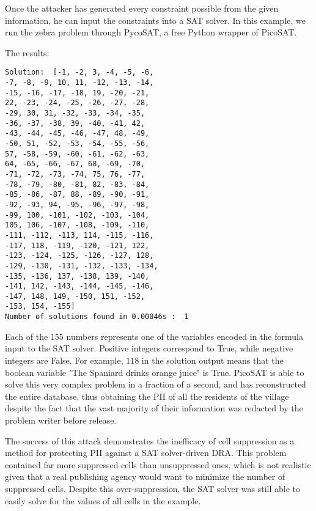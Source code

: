 \documentclass[jou,apacite]{apa6}
\begin{document}
Once the attacker has generated every constraint possible from the given information, he can input the constraints into a SAT solver. In this example, we run the zebra problem through PycoSAT, a free Python wrapper of PicoSAT.

The results:

\begin{verbatim}
Solution:  [-1, -2, 3, -4, -5, -6,
-7, -8, -9, 10, 11, -12, -13, -14,
-15, -16, -17, -18, 19, -20, -21,
22, -23, -24, -25, -26, -27, -28,
-29, 30, 31, -32, -33, -34, -35,
-36, -37, -38, 39, -40, -41, 42,
-43, -44, -45, -46, -47, 48, -49,
-50, 51, -52, -53, -54, -55, -56,
57, -58, -59, -60, -61, -62, -63,
64, -65, -66, -67, 68, -69, -70,
-71, -72, -73, -74, 75, 76, -77,
-78, -79, -80, -81, 82, -83, -84,
-85, -86, -87, 88, -89, -90, -91,
-92, -93, 94, -95, -96, -97, -98,
-99, 100, -101, -102, -103, -104,
105, 106, -107, -108, -109, -110,
-111, -112, -113, 114, -115, -116,
-117, 118, -119, -120, -121, 122,
-123, -124, -125, -126, -127, 128,
-129, -130, -131, -132, -133, -134,
-135, -136, 137, -138, 139, -140,
-141, 142, -143, -144, -145, -146,
-147, 148, 149, -150, 151, -152,
-153, 154, -155]
Number of solutions found in 0.00046s :  1
\end{verbatim}

Each of the 155 numbers represents one of the variables encoded in the formula input to the SAT solver.
Positive integers correspond to True, while negative integers are False. For example, $118$ in the solution output means that the boolean variable "The Spaniard drinks orange juice" is True.
PicoSAT is able to solve this very complex problem in a fraction of a second, and has reconstructed the entire database, thus obtaining the PII of all the residents of the village despite the fact that the vast majority of their information was redacted by the problem writer before release.

The success of this attack demonstrates the inefficacy of
cell suppression as a method for protecting PII against
a SAT solver-driven DRA. This problem
contained far more suppressed cells than unsuppressed ones, which is not realistic given that a real publishing agency would want to minimize the number of suppressed cells. Despite this over-suppression, the SAT solver was still able to easily solve for the values of all cells in the example.





\end{document}
